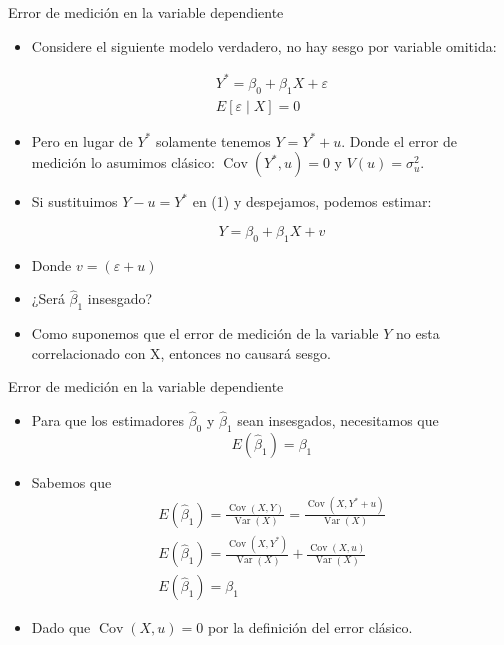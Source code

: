 \documentclass[10pt]{beamer}
\begin{document}
\begin{frame}{Error de medición en la variable dependiente}
    \begin{itemize}
        \item Considere el siguiente modelo verdadero,  no hay sesgo por variable omitida: 

        \begin{eqnarray}
                                   Y^{*}=\beta_{0}+\beta_{1} X+\varepsilon\\
                                   E[\varepsilon \mid X]=0  \nonumber
       \end{eqnarray}
        \item Pero en lugar de $Y^{*}$ solamente tenemos $Y=Y^{*}+u$. Donde el error de medici\'on lo asumimos cl\'asico: $\operatorname{Cov}\left(Y^{*}, u\right)=0$ y $V(u)=\sigma_{u}^{2}$.
        \item Si sustituimos $Y-u=Y^{*}$ en (1) y despejamos, podemos estimar:
            
        \begin{equation}
             Y=\beta_{0}+\beta_{1} X+v        \end{equation}
       
        
        \item Donde $v=(\varepsilon+u)$
        \item ¿Ser\'a $\hat{\beta}_{1}$ insesgado?
        \item Como suponemos que el error de medici\'on de la variable $Y$ {\color{blue} no} esta correlacionado con X, entonces no causar\'a sesgo.
    \end{itemize}
\end{frame}

\begin{frame}{Error de medición en la variable dependiente}
    \begin{itemize}
              \item Para que los estimadores $\hat{\beta}_{0}$ y $\hat{\beta}_{1}$ sean insesgados, necesitamos que
        $$
        E\left(\hat{\beta}_{1}\right)=\beta_{1}
        $$
        \item Sabemos que
        $$
        \begin{gathered}
        E\left(\hat{\beta}_{1}\right)=\frac{\operatorname{Cov}(X, Y)}{\operatorname{Var}(X)}=\frac{\operatorname{Cov}\left(X, Y^{*}+u\right)}{\operatorname{Var}(X)} \\
        E\left(\hat{\beta}_{1}\right)=\frac{\operatorname{Cov}\left(X, Y^{*}\right)}{\operatorname{Var}(X)}+\frac{\operatorname{Cov}(X, u)}{\operatorname{Var}(X)} \\
        E\left(\hat{\beta}_{1}\right)=\beta_{1}
        \end{gathered}
        $$
        \item {\color{blue}Dado que $\operatorname{Cov}(X, u)=0$ por la definición del error clásico.}
    \end{itemize}
\end{frame}
\end{document}
